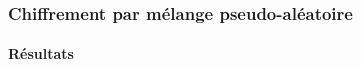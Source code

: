         \begin{frame}
            \frametitle{Chiffrement par mélange pseudo-aléatoire}
            \framesubtitle{Résultats}
            \begin{columns}
                \begin{column}{.5\linewidth}
                \end{column}


\end{columns}
\end{frame}
